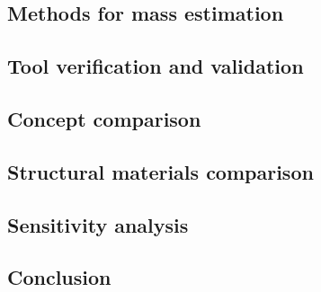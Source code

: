 \subsection{Methods for mass estimation}\label{sec:strucmeth}

\subsection{Tool verification and validation}\label{sec:strucvv}

\subsection{Concept comparison}\label{sec:struccc}

\subsection{Structural materials comparison}\label{sec:strucmat}

\subsection{Sensitivity analysis}\label{sec:strucsens}

\subsection{Conclusion}\label{sec:strucconc}

